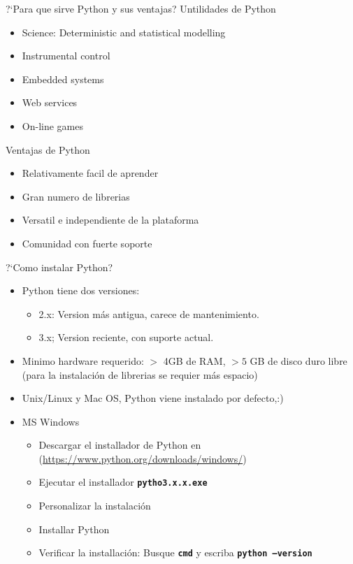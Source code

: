 \documentclass[
10pt,
aspectratio=169,
]{beamer}
\newcommand{\co}[1]{\alert{\textbf{\texttt{#1}}}}
\begin{document}
\begin{frame}[c]{?`Para que sirve Python y sus ventajas?}
Untilidades de Python
\begin{itemize}
\item Science: Deterministic and statistical modelling
\item Instrumental control
\item Embedded systems
\item Web services
\item On-line games
\end{itemize}
Ventajas de Python
\begin{itemize}
\item Relativamente facil de aprender
\item Gran numero de librerias
\item Versatil e independiente de la plataforma
\item Comunidad con fuerte soporte
\end{itemize}
\end{frame}


\begin{frame}[c]{?`Como instalar Python?}
\begin{itemize}
\item Python tiene dos versiones:
\begin{itemize}
\item 2.x: Version m\'as antigua, carece de mantenimiento.
\item 3.x; Version reciente, con suporte actual. 
\end{itemize}
\item Minimo hardware requerido: $>$ 4GB de RAM, $>5$ GB de disco duro libre (para la instalaci\'on de librerias se requier m\'as espacio)
\end{itemize}
\begin{itemize}
\item Unix/Linux y Mac OS, Python viene instalado por defecto,:)

\item MS Windows
\begin{itemize}
\item Descargar el installador de Python en (\href{https://www.python.org/downloads/windows/}{https://www.python.org/downloads/windows/})
\item Ejecutar el installador \co{pytho3.x.x.exe}
\item Personalizar la instalaci\'on
\item Installar Python
\item Verificar la installaci\'on: Busque \co{cmd} y escriba \co{python --version}
\end{itemize}
\end{itemize}
\end{frame}
\end{document}
